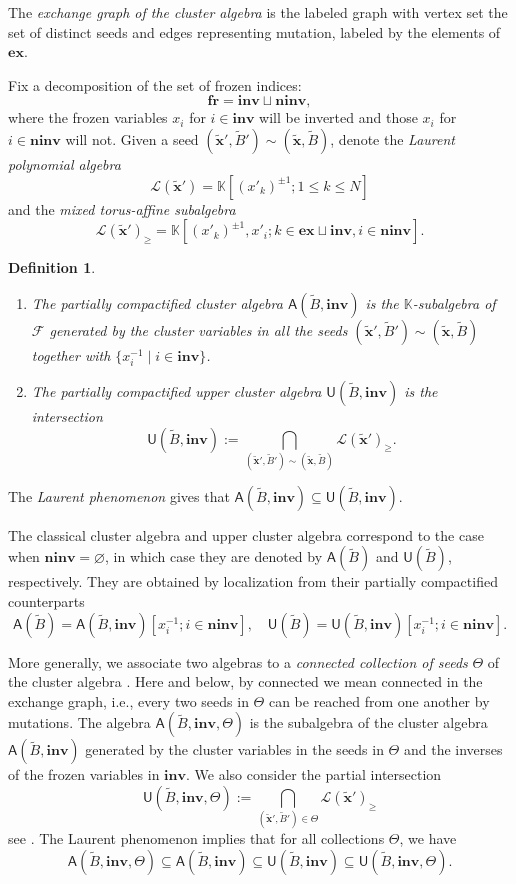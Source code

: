 \documentclass[11pt]{amsart}
\theoremstyle{plain}
\newtheorem{definition}[theorem]{Definition}
\newcommand \bde[1] { \begin{definition}\label{d#1}\rm }
\newcommand {\ede} { \end{definition} }
\def \KK {{\mathbb C}}
\def \KK {{\mathbb K}}
\def \A {{\boldsymbol{\mathsf A}}}
\def \U {{\boldsymbol{\mathsf U}}}
\def \B  {{\widetilde{B}}}
\newcommand \ex {{\mathbf{ex}}}
\newcommand \fr {{\mathbf{fr}}}
\newcommand \inv {{\mathbf{inv}}}
\newcommand \ninv {{\mathbf{ninv}}}
\def \x {{\wt{\mathbf{x}}}} %
\def \LL {{\mathcal{L}}}
\def \FF {{\mathcal{F}}}
\def \wt {\widetilde}
\begin{document}
The {\em{exchange graph of the cluster algebra}} is the labeled graph with vertex set the set of distinct seeds and edges representing mutation, labeled by the elements of $\ex$.

Fix a decomposition of the set of frozen indices: 
\[
\fr = \inv \sqcup \ninv,
\]
where the frozen variables $x_i$ for $i \in \inv$ will be inverted and those $x_i$ for $i \in \ninv$ will not. Given a seed $(\x',\B')\sim (\x,\B)$, denote the {\em{Laurent polynomial algebra}}
\[
\LL(\x') = \KK[(x'_k)^{\pm 1}; 1 \leq k \leq N]
\]
and the {\em{mixed torus-affine subalgebra}}
\[
\LL(\x')_\geq = \KK[(x'_k)^{\pm 1}, x'_i; k \in \ex \sqcup \inv, i \in \ninv].
\]
\bde{CAs} \cite{BFZ05,FZ1}
\hfill 
\begin{enumerate}
\item[(i)] The {\em{partially compactified cluster algebra}} $\A(\B, \inv)$ is the $\KK$-subalgebra of $\FF$ generated by 
the cluster variables in all the seeds $(\x',\B')\sim( \x, \B)$ together with $\{ x_i^{-1} \mid i \in \inv\}$.
\item[(ii)] The {\em{partially compactified upper cluster algebra}} $\U(\B, \inv)$ is the intersection 
\[
\U(\B,\inv):= \bigcap_{(\x', \B') \sim (\x, \B)} \LL(\x')_\geq.
\]
\end{enumerate}
\ede

The {\em{Laurent phenomenon}} \cite{FZlp} gives that $\A(\B, \inv) \subseteq \U(\B, \inv)$. 

The classical cluster algebra and upper cluster algebra correspond to the case when $\ninv = \varnothing$, in which case they are denoted by 
$\A(\B)$ and $\U(\B)$, respectively. They are obtained by localization from their partially compactified counterparts 
\[
\A(\B) = \A(\B, \inv)[x_i^{-1}; i \in \ninv], \quad 
\U(\B) = \U(\B, \inv)[x_i^{-1}; i \in \ninv].
\]

More generally, we associate two algebras to a {\em{connected collection of seeds}} $\Theta$ of the cluster algebra \cite{F}. Here and below, by connected we mean connected in the exchange graph, i.e., every two seeds in $\Theta$ can be reached from one another by mutations. 
The algebra  
$\A(\B,\inv, \Theta)$ is the subalgebra of the cluster algebra $\A(\B,\inv)$ generated by the cluster variables in the seeds in $\Theta$ and the inverses of the frozen variables in $\inv$. We also consider the partial intersection 
\[
\U(\B,\inv, \Theta):= \bigcap_{(\x', \B') \in \Theta} \LL(\x')_\geq
\] see \cite{F,HLY}. The Laurent phenomenon implies that for all collections $\Theta$, we have 
\[
\A(\B,\inv, \Theta) \subseteq \A(\B,\inv) \subseteq \U(\B,\inv) \subseteq \U(\B,\inv, \Theta). 
\]
\end{document}
